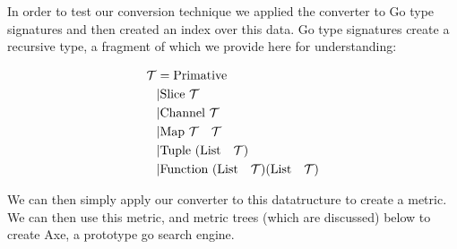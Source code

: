 In order to test our conversion technique we applied the converter to Go type signatures
and then created an index over this data.
Go type signatures create a recursive type, a fragment of which we provide here for understanding:

\begin{align*}
\mathcal{T} &= \text{Primative} \\ 
&| \text{Slice } \mathcal{T} \\ 
&| \text{Channel } \mathcal{T} \\ 
&| \text{Map } \mathcal{T} \quad \mathcal{T} \\
&| \text{Tuple } (\text{List}\quad \mathcal{T}) \\
&| \text{Function } (\text{List}\quad \mathcal{T}) (\text{List}\quad \mathcal{T}) 
\end{align*}

We can then simply apply our converter to this datatructure to create a metric.
We can then use this metric, and metric trees (which are discussed) below to create Axe,
a prototype go search engine.